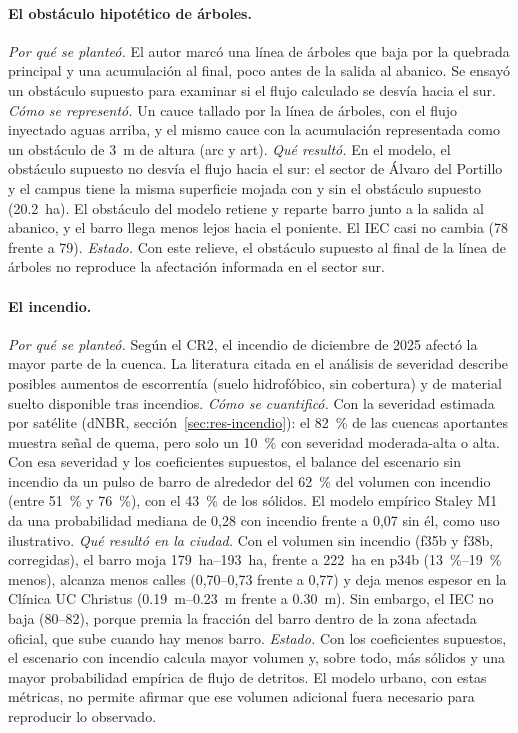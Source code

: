 \paragraph{El obstáculo hipotético de árboles.} \emph{Por qué se planteó.} El autor marcó una línea de árboles que baja por la quebrada principal y una acumulación al final, poco antes de la salida al abanico. Se ensayó un obstáculo supuesto para examinar si el flujo calculado se desvía hacia el sur. \emph{Cómo se representó.} Un cauce tallado por la línea de árboles, con el flujo inyectado aguas arriba, y el mismo cauce con la acumulación representada como un obstáculo de \SI{3}{m} de altura (arc y art). \emph{Qué resultó.} En el modelo, el obstáculo supuesto no desvía el flujo hacia el sur: el sector de Álvaro del Portillo y el campus tiene la misma superficie mojada con y sin el obstáculo supuesto (\SI{20,2}{ha}). El obstáculo del modelo retiene y reparte barro junto a la salida al abanico, y el barro llega menos lejos hacia el poniente. El IEC casi no cambia (78 frente a 79). \emph{Estado.} Con este relieve, el obstáculo supuesto al final de la línea de árboles no reproduce la afectación informada en el sector sur.

\paragraph{El incendio.} \emph{Por qué se planteó.} Según el CR2, el incendio de diciembre de 2025 afectó la mayor parte de la cuenca. La literatura citada en el análisis de severidad describe posibles aumentos de escorrentía (suelo hidrofóbico, sin cobertura) y de material suelto disponible tras incendios. \emph{Cómo se cuantificó.} Con la severidad estimada por satélite (dNBR, sección~\ref{sec:res-incendio}): el \SI{82}{\percent} de las cuencas aportantes muestra señal de quema, pero solo un \SI{10}{\percent} con severidad moderada-alta o alta. Con esa severidad y los coeficientes supuestos, el balance del escenario sin incendio da un pulso de barro de alrededor del \SI{62}{\percent} del volumen con incendio (entre \SI{51}{\percent} y \SI{76}{\percent}), con el \SI{43}{\percent} de los sólidos. El modelo empírico Staley M1 da una probabilidad mediana de 0,28 con incendio frente a 0,07 sin él, como uso ilustrativo. \emph{Qué resultó en la ciudad.} Con el volumen sin incendio (f35b y f38b, corregidas), el barro moja \SIrange{179}{193}{ha}, frente a \SI{222}{ha} en p34b (\SIrange{13}{19}{\percent} menos), alcanza menos calles (0,70--0,73 frente a 0,77) y deja menos espesor en la Clínica UC Christus (\SIrange{0,19}{0,23}{m} frente a \SI{0,30}{m}). Sin embargo, el IEC no baja (80--82), porque premia la fracción del barro dentro de la zona afectada oficial, que sube cuando hay menos barro. \emph{Estado.} Con los coeficientes supuestos, el escenario con incendio calcula mayor volumen y, sobre todo, más sólidos y una mayor probabilidad empírica de flujo de detritos. El modelo urbano, con estas métricas, no permite afirmar que ese volumen adicional fuera necesario para reproducir lo observado.

